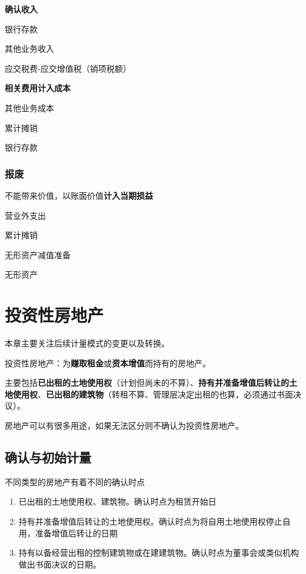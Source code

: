 \documentclass[UTF8,12pt]{ctexart}
\newenvironment{Dr}{%
	\begin{list}{}%
		{
			\setlength{\leftmargin}{2em}
			\setlength{\labelwidth}{2em}
			\setlength{\labelsep}{0pt}
			\setlength{\itemindent}{0pt}
			\setlength{\listparindent}{0pt}
			\setlength{\parsep}{0pt}
			\setlength{\topsep}{0pt}
		}
		\item[\textbf{借：}]
	}{%
	\end{list}
}
\newenvironment{Cr}{%
	\begin{list}{}%
		{
			\setlength{\leftmargin}{3em}
			\setlength{\labelwidth}{2em}
			\setlength{\labelsep}{0pt}
			\setlength{\itemindent}{0pt}
			\setlength{\listparindent}{0pt}
			\setlength{\parsep}{0pt}
			\setlength{\topsep}{0pt}
		}
		\item[\textbf{贷：}]
	}{%
	\end{list}
}
\numberwithin{equation}{section} %
\numberwithin{figure}{section}
\numberwithin{table}{section}
\begin{document}
	\textbf{确认收入}
	
	\begin{Dr}
		银行存款
	\end{Dr}
	\begin{Cr}
		其他业务收入
		
		应交税费-应交增值税（销项税额）
	\end{Cr}

	
	\textbf{相关费用计入成本}
	
	\begin{Dr}
		其他业务成本
	\end{Dr}
	\begin{Cr}
		累计摊销
		
		银行存款
	\end{Cr}
	
	
	\subsubsection{报废}
	
	不能带来价值，以账面价值\textbf{计入当期损益}
	
	\begin{Dr}
		营业外支出
		
		累计摊销
		
		无形资产减值准备
	\end{Dr}
	\begin{Cr}
		无形资产
	\end{Cr}

	
	\newpage
	\section{投资性房地产}
	
	本章主要关注后续计量模式的变更以及转换。
	
	投资性房地产：为\textbf{赚取租金}或\textbf{资本增值}而持有的房地产。
	
	主要包括\textbf{已出租的土地使用权}（计划但尚未的不算）、\textbf{持有并准备增值后转让的土地使用权}、\textbf{已出租的建筑物}（转租不算、管理层决定出租的也算，必须通过书面决议）。
	
	房地产可以有很多用途，如果无法区分则不确认为投资性房地产。
	
	\subsection{确认与初始计量}
	不同类型的房地产有着不同的确认时点
	\begin{enumerate}
		\item 已出租的土地使用权、建筑物。确认时点为租赁开始日
		
		\item 持有并准备增值后转让的土地使用权。确认时点为将自用土地使用权停止自用，准备增值后转让的日期
		
		\item 持有以备经营出租的控制建筑物或在建建筑物。确认时点为董事会或类似机构做出书面决议的日期。
	\end{enumerate}
	
\end{document}
